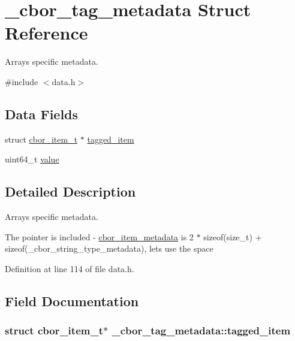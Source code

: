 \hypertarget{struct__cbor__tag__metadata}{\section{\-\_\-cbor\-\_\-tag\-\_\-metadata Struct Reference}
\label{struct__cbor__tag__metadata}
}


Arrays specific metadata.  




{\ttfamily \#include $<$data.\-h$>$}

\subsection*{Data Fields}
\begin{DoxyCompactItemize}
\item 
struct \hyperlink{structcbor__item__t}{cbor\-\_\-item\-\_\-t} $\ast$ \hyperlink{struct__cbor__tag__metadata_ae275f5a8e0a72192d393f770db923907}{tagged\-\_\-item}
\item 
uint64\-\_\-t \hyperlink{struct__cbor__tag__metadata_a23bcf332e94e901e5bc3b48aab0d89da}{value}
\end{DoxyCompactItemize}


\subsection{Detailed Description}
Arrays specific metadata. 

The pointer is included -\/ \hyperlink{unioncbor__item__metadata}{cbor\-\_\-item\-\_\-metadata} is 2 $\ast$ sizeof(size\-\_\-t) + sizeof(\-\_\-cbor\-\_\-string\-\_\-type\-\_\-metadata), lets use the space 

Definition at line 114 of file data.\-h.



\subsection{Field Documentation}
\hypertarget{struct__cbor__tag__metadata_ae275f5a8e0a72192d393f770db923907}{
\subsubsection[{tagged\-\_\-item}]{\setlength{\rightskip}{0pt plus 5cm}struct {\bf cbor\-\_\-item\-\_\-t}$\ast$ \-\_\-cbor\-\_\-tag\-\_\-metadata\-::tagged\-\_\-item}}\label{struct__cbor__tag__metadata_ae275f5a8e0a72192d393f770db923907}


